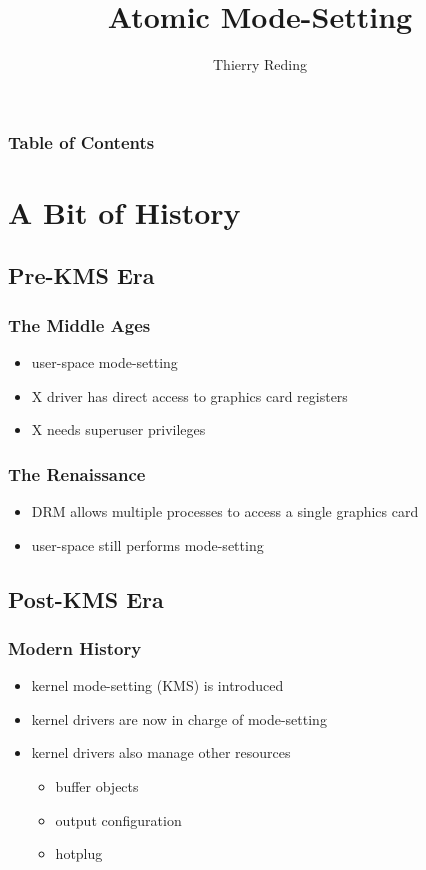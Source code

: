 \documentclass[t]{beamer}
\begin{document}
\title{Atomic Mode-Setting}
\author{Thierry Reding}

\frame{\titlepage}

\begin{frame}
	\frametitle{Table of Contents}
	\tableofcontents
\end{frame}

\section{A Bit of History}

\subsection{Pre-KMS Era}

\begin{frame}
	\frametitle{The Middle Ages}
	\begin{itemize}
		\item user-space mode-setting
		\item X driver has direct access to graphics card registers
		\item X needs superuser privileges
	\end{itemize}
\end{frame}

\begin{frame}
	\frametitle{The Renaissance}
	\begin{itemize}
		\item DRM allows multiple processes to access a single graphics card
		\item user-space still performs mode-setting
	\end{itemize}
\end{frame}

\subsection{Post-KMS Era}

\begin{frame}
	\frametitle{Modern History}
	\begin{itemize}
		\item kernel mode-setting (KMS) is introduced
		\item kernel drivers are now in charge of mode-setting
		\item kernel drivers also manage other resources
			\begin{itemize}
				\item buffer objects
				\item output configuration
				\item hotplug
			\end{itemize}
	\end{itemize}
\end{frame}
\end{document}
